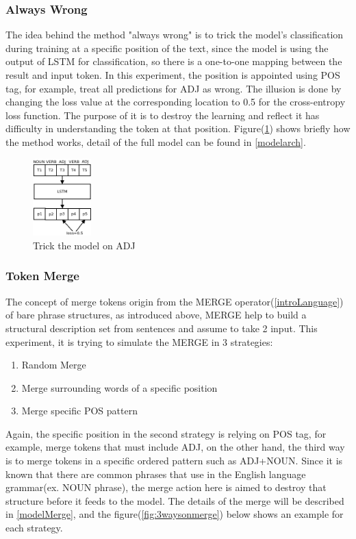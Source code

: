 \documentclass[12pt]{article}
\begin{document}
\subsubsection{Always Wrong}
The idea behind the method "always wrong" is to trick the model's classification during training at a specific position of the text, since the model is using the output of LSTM for classification, so there is a one-to-one mapping between the result and input token. In this experiment, the position is appointed using POS tag, for example, treat all predictions for ADJ as wrong. The illusion is done by changing the loss value at the corresponding location to 0.5 for the cross-entropy loss function. The purpose of it is to destroy the learning and reflect it has difficulty in understanding the token at that position. Figure(\ref{fig:alwayswrong}) shows briefly how the method works, detail of the full model can be found in \ref{modelarch}.
\begin{figure} [!h]
\begin{center}
\includegraphics[width=0.2\textwidth]{figures/alwayswrong.png}
\caption{Trick the model on ADJ}
\label{fig:alwayswrong}
\end{center}
\end{figure}

\subsubsection{Token Merge} \label{incompmerge}
The concept of merge tokens origin from the MERGE operator(\ref{introLanguage}) of bare phrase structures, as introduced above, MERGE help to build a structural description set from sentences and assume to take 2 input. This experiment, it is trying to simulate the MERGE in 3 strategies:
\begin{center}
\begin{enumerate}
    \item Random Merge
    \item Merge surrounding words of a specific position
    \item Merge specific POS pattern
\end{enumerate}
\end{center}
Again, the specific position in the second strategy is relying on POS tag, for example, merge tokens that must include ADJ, on the other hand, the third way is to merge tokens in a specific ordered pattern such as ADJ+NOUN. Since it is known that there are common phrases that use in the English language grammar(ex. NOUN phrase), the merge action here is aimed to destroy that structure before it feeds to the model. The details of the merge will be described in \ref{modelMerge}, and the figure(\ref{fig:3waysonmerge}) below shows an example for each strategy.
\end{document}

